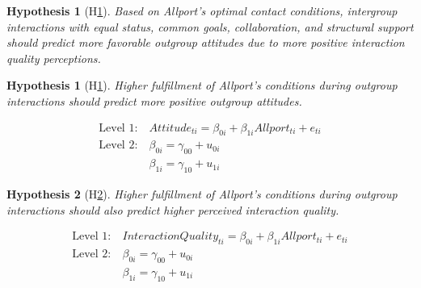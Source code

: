 \documentclass[man, 12pt, a4paper, mask]{apa7}
\theoremstyle{break}
\theoremstyle{plain}
\newtheorem{hyp}{Hypothesis}
\newtheorem{subhyp}{Hypothesis}
\begin{document}
\begin{mdframed}[style=mdfhypothesis]
    \begin{hyp}[H\ref{hyp:Allport}] \label{hyp:Allport}
    Based on Allport's optimal contact conditions, intergroup interactions with equal status, common goals, collaboration, and structural support should predict more favorable outgroup attitudes due to more positive interaction quality perceptions.
    \end{hyp}
    
    \setcounter{subhyp}{0}
    \begin{subhyp}[H\ref{hyp:AttAllport}] \label{hyp:AttAllport}
    \addtolength{\leftskip}{\subhypskip}
    Higher fulfillment of Allport's conditions during outgroup interactions should predict more positive outgroup attitudes.
    \end{subhyp}
    
    \begin{fleqn}[\eqskip]
      \begin{equation} \label{eq:SlopesAttAllport}
        \begin{split}
            \textrm{Level 1:} &\ Attitude_{ti} = \beta_{0i} + \beta_{1i}Allport_{ti} + e_{ti}\\
            \textrm{Level 2:} &\ \beta_{0i} = \gamma_{00} + u_{0i} \\
                              &\ \beta_{1i} = \gamma_{10} + u_{1i}
        \end{split}
      \end{equation}
    \end{fleqn}
    
    \begin{subhyp}[H\ref{hyp:QltAllport}] \label{hyp:QltAllport}
    \addtolength{\leftskip}{\subhypskip}
    Higher fulfillment of Allport's conditions during outgroup interactions should also predict higher perceived interaction quality.
    \end{subhyp}
    
    \begin{fleqn}[\eqskip]
      \begin{equation} \label{eq:SlopesQltAllport}
        \begin{split}
            \textrm{Level 1:} &\ InteractionQuality_{ti} = \beta_{0i} + \beta_{1i}Allport_{ti} + e_{ti}\\
            \textrm{Level 2:} &\ \beta_{0i} = \gamma_{00} + u_{0i} \\
                              &\ \beta_{1i} = \gamma_{10} + u_{1i}
        \end{split}
      \end{equation}
    \end{fleqn}
    

\end{mdframed}
\end{document}
